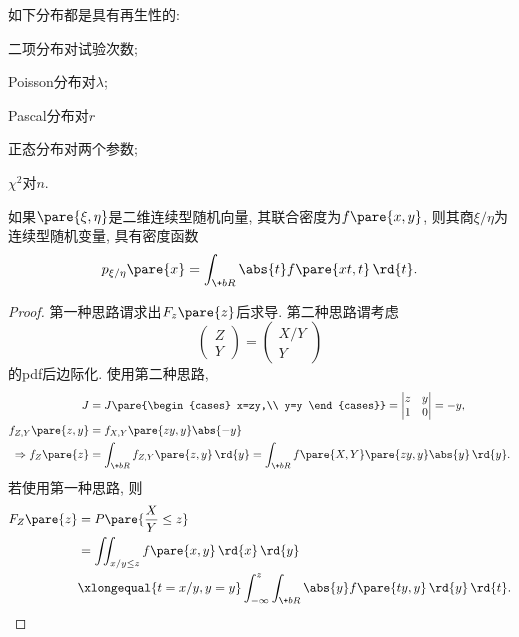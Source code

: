 \documentclass{ctexart}
\begin{document}
如下分布都是具有再生性的:
\begin{cenum}
    \item 二项分布对试验次数;
    \item Poisson分布对$\lambda$;
    \item Pascal分布对$r$
    \item 正态分布对两个参数;
    \item $\chi^2$对$n$.
\end{cenum}
\begin{theorem}
    如果$\pare{\xi,\eta}$是二维连续型随机向量, 其联合密度为$f\pare{x,y}$, 则其商$\xi/\eta$为连续型随机变量, 具有密度函数
    \[ p_{\xi/\eta}\pare{x} = \int_{\+bR} \abs{t}f\pare{xt,t}\,\rd{t}. \]
\end{theorem}
\begin{proof}
    第一种思路谓求出$F_z\pare{z}$后求导. 第二种思路谓考虑
    \[ \begin{pmatrix}
        Z\\
        Y
    \end{pmatrix} = \begin{pmatrix}
        X/Y\\
        Y
    \end{pmatrix} \]
    的pdf后边际化. 使用第二种思路,
    \begin{align*}
        J &= J\pare{\begin{cases}
            x=zy,\\
            y=y
        \end{cases}} = \begin{vmatrix}
            z & y \\
            1 & 0
        \end{vmatrix} = -y,\\
        f_{Z,Y}\pare{z,y} &= f_{X,Y}\pare{zy,y}\abs{-y} \\
        \Rightarrow f_Z\pare{z} &= \int_{\+bR} f_{Z,Y}\pare{z,y}\,\rd{y} = \int_{\+bR} f\pare{X,Y}\pare{zy,y}\abs{y}\,\rd{y}.
    \end{align*}
    若使用第一种思路, 则
    \begin{align*}
        F_Z\pare{z} &= P\pare{\frac{X}{Y}\le z} \\
        &= \iint_{x/y \le z} f\pare{x,y}\,\rd{x}\,\rd{y} \\
        &\xlongequal{t=x/y,y=y} \int_{-\infty}^z \int_{\+bR}\abs{y}f\pare{ty,y}\,\rd{y}\,\rd{t}.
    \end{align*}
\end{proof}
\end{document}
